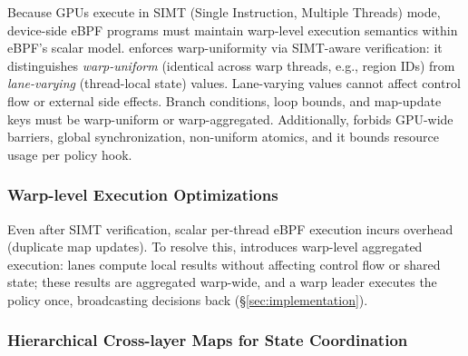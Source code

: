 Because GPUs execute in SIMT (Single Instruction, Multiple Threads) mode, device-side eBPF programs must maintain warp-level execution semantics within eBPF’s scalar model.
\sys{} enforces warp-uniformity via SIMT-aware verification: it distinguishes \emph{warp-uniform} (identical across warp threads, e.g., region IDs) from \emph{lane-varying} (thread-local state) values.
Lane-varying values cannot affect control flow or external side effects.
Branch conditions, loop bounds, and map-update keys must be warp-uniform or warp-aggregated.
Additionally, \sys{} forbids GPU-wide barriers, global synchronization, non-uniform atomics, and it bounds resource usage per policy hook.

\subsubsection{Warp-level Execution Optimizations}

Even after SIMT verification, scalar per-thread eBPF execution incurs overhead (\eg duplicate map updates).
To resolve this, \sys{} introduces warp-level aggregated execution: lanes compute local results without affecting control flow or shared state; these results are aggregated warp-wide, and a warp leader executes the policy once, broadcasting decisions back (\S\ref{sec:implementation}).


\subsubsection{Hierarchical Cross-layer Maps for State Coordination}
\label{sec:cross-layer-maps}

